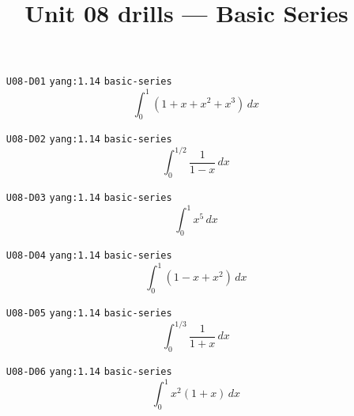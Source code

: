 
\title{Unit 08 drills --- Basic Series}

\maketitle
\begin{enumerate}
\item[\texttt{U08-D01}] \texttt{yang:1.14} \texttt{basic-series}
\[ \int_0^1(1+x+x^2+x^3)\,dx \]
\item[\texttt{U08-D02}] \texttt{yang:1.14} \texttt{basic-series}
\[ \int_0^{1/2}\frac{1}{1-x}\,dx \]
\item[\texttt{U08-D03}] \texttt{yang:1.14} \texttt{basic-series}
\[ \int_0^1 x^5\,dx \]
\item[\texttt{U08-D04}] \texttt{yang:1.14} \texttt{basic-series}
\[ \int_0^1(1-x+x^2)\,dx \]
\item[\texttt{U08-D05}] \texttt{yang:1.14} \texttt{basic-series}
\[ \int_0^{1/3}\frac{1}{1+x}\,dx \]
\item[\texttt{U08-D06}] \texttt{yang:1.14} \texttt{basic-series}
\[ \int_0^1 x^2(1+x)\,dx \]
\end{enumerate}

